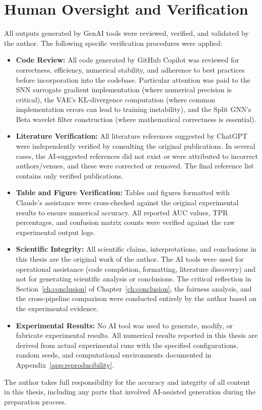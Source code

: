 \section{Human Oversight and Verification}

All outputs generated by GenAI tools were reviewed, verified, and validated by the author. The following specific verification procedures were applied:

\begin{itemize}
\item \textbf{Code Review:} All code generated by GitHub Copilot was reviewed for correctness, efficiency, numerical stability, and adherence to best practices before incorporation into the codebase. Particular attention was paid to the SNN surrogate gradient implementation (where numerical precision is critical), the VAE's KL-divergence computation (where common implementation errors can lead to training instability), and the Split GNN's Beta wavelet filter construction (where mathematical correctness is essential).

\item \textbf{Literature Verification:} All literature references suggested by ChatGPT were independently verified by consulting the original publications. In several cases, the AI-suggested references did not exist or were attributed to incorrect authors/venues, and these were corrected or removed. The final reference list contains only verified publications.

\item \textbf{Table and Figure Verification:} Tables and figures formatted with Claude's assistance were cross-checked against the original experimental results to ensure numerical accuracy. All reported AUC values, TPR percentages, and confusion matrix counts were verified against the raw experimental output logs.

\item \textbf{Scientific Integrity:} All scientific claims, interpretations, and conclusions in this thesis are the original work of the author. The AI tools were used for operational assistance (code completion, formatting, literature discovery) and not for generating scientific analysis or conclusions. The critical reflection in Section~\ref{ch:conclusion} of Chapter~\ref{ch:conclusion}, the fairness analysis, and the cross-pipeline comparison were conducted entirely by the author based on the experimental evidence.

\item \textbf{Experimental Results:} No AI tool was used to generate, modify, or fabricate experimental results. All numerical results reported in this thesis are derived from actual experimental runs with the specified configurations, random seeds, and computational environments documented in Appendix~\ref{app:reproducibility}.
\end{itemize}

The author takes full responsibility for the accuracy and integrity of all content in this thesis, including any parts that involved AI-assisted generation during the preparation process.
